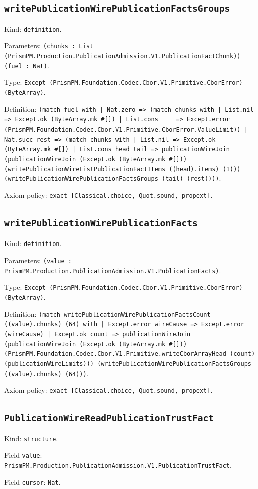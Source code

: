 \documentclass[11pt]{article}
\begin{document}
\subsection*{\texttt{writePublicationWirePublicationFactsGroups}}
\noindent Kind: \texttt{definition}.\par
\noindent Parameters: \texttt{(chunks : List (PrismPM.Production.PublicationAdmission.V1.PublicationFactChunk)) (fuel : Nat)}.\par
\noindent Type: \texttt{Except (PrismPM.Foundation.Codec.Cbor.V1.Primitive.CborError) (ByteArray)}.\par
\noindent Definition: \texttt{(match fuel with | Nat.zero => (match chunks with | List.nil => Except.ok (ByteArray.mk \#[]) | List.cons \_ \_ => Except.error (PrismPM.Foundation.Codec.Cbor.V1.Primitive.CborError.ValueLimit)) | Nat.succ rest => (match chunks with | List.nil => Except.ok (ByteArray.mk \#[]) | List.cons head tail => publicationWireJoin (publicationWireJoin (Except.ok (ByteArray.mk \#[])) (writePublicationWireListPublicationFactItems ((head).items) (1))) (writePublicationWirePublicationFactsGroups (tail) (rest))))}.\par
\noindent Axiom policy: \texttt{exact [Classical.choice, Quot.sound, propext]}.\par
\subsection*{\texttt{writePublicationWirePublicationFacts}}
\noindent Kind: \texttt{definition}.\par
\noindent Parameters: \texttt{(value : PrismPM.Production.PublicationAdmission.V1.PublicationFacts)}.\par
\noindent Type: \texttt{Except (PrismPM.Foundation.Codec.Cbor.V1.Primitive.CborError) (ByteArray)}.\par
\noindent Definition: \texttt{(match writePublicationWirePublicationFactsCount ((value).chunks) (64) with | Except.error wireCause => Except.error (wireCause) | Except.ok count => publicationWireJoin (publicationWireJoin (Except.ok (ByteArray.mk \#[])) (PrismPM.Foundation.Codec.Cbor.V1.Primitive.writeCborArrayHead (count) (publicationWireLimits))) (writePublicationWirePublicationFactsGroups ((value).chunks) (64)))}.\par
\noindent Axiom policy: \texttt{exact [Classical.choice, Quot.sound, propext]}.\par
\subsection*{\texttt{PublicationWireReadPublicationTrustFact}}
\noindent Kind: \texttt{structure}.\par
\noindent Field \texttt{value}: \texttt{PrismPM.Production.PublicationAdmission.V1.PublicationTrustFact}.\par
\noindent Field \texttt{cursor}: \texttt{Nat}.\par
\end{document}
